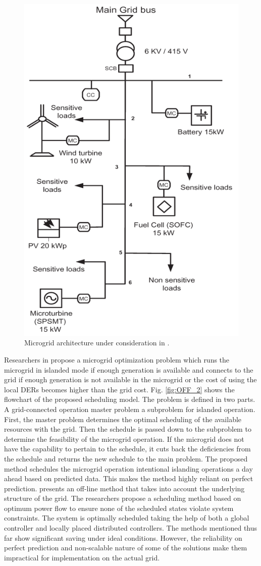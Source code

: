 \begin{figure}[!h]
\centering
\includegraphics[width=0.5\linewidth, angle = 90]{figs/OFF_1.png}
\caption[Microgrid architecture under consideration]{Microgrid architecture under consideration in \cite{ACh13}.}
\label{fig:OFF_1}
\end{figure}

Researchers in \cite{AKh14} propose a microgrid optimization problem which runs the microgrid in islanded mode if enough generation is available and connects to the grid if enough generation is not available in the microgrid or the cost of using the local DERs becomes higher than the grid cost. Fig. \ref{fig:OFF_2}  shows the flowchart of the proposed scheduling model. The problem is defined in two parts. A grid-connected operation master problem a subproblem for islanded operation. First, the master problem determines the optimal scheduling of the available resources with the grid. Then the schedule is passed down to the subproblem to determine the feasibility of the microgrid operation. If the microgrid does not have the capability to pertain to the schedule, it cuts back the deficiencies from the schedule and returns the new schedule to the main problem.  The proposed method schedules the microgrid operation intentional islanding operations a day ahead based on predicted data. This makes the method highly reliant on perfect prediction. \cite{WSh15} presents an off-line method that takes into account the underlying structure of the grid. The researchers propose a scheduling method based on optimum power flow to ensure none of the scheduled states violate system constraints. The system is optimally scheduled taking the help of both a global controller and locally placed distributed controllers. The methods mentioned thus far show significant saving under ideal conditions. However, the reliability on perfect prediction and non-scalable nature of some of the solutions make them impractical for implementation on the actual grid.

